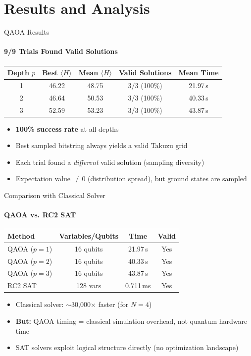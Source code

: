 \documentclass[aspectratio=169, t]{beamer}
\begin{document}
\section{Results and Analysis}

\begin{frame}{QAOA Results}
\framesubtitle{9/9 Trials Found Valid Solutions}

\begin{table}
\centering
\begin{tabular}{@{} ccccc @{}}
    \toprule
    Depth $p$ & Best $\langle H \rangle$ & Mean $\langle H \rangle$ & Valid Solutions & Mean Time \\
    \midrule
    1 & 46.22 & 48.75 & 3/3 (100\%) & 21.97\,s \\
    2 & 46.64 & 50.53 & 3/3 (100\%) & 40.33\,s \\
    3 & 52.59 & 53.23 & 3/3 (100\%) & 43.87\,s \\
    \bottomrule
\end{tabular}
\end{table}

\bigskip
\begin{itemize}
    \item \textbf{100\% success rate} at all depths
    \item Best sampled bitstring always yields a valid Takuzu grid
    \item Each trial found a \emph{different} valid solution (sampling diversity)
    \item Expectation value $\neq 0$ (distribution spread), but ground states are sampled
\end{itemize}
\end{frame}

\begin{frame}{Comparison with Classical Solver}
\framesubtitle{QAOA vs. RC2 SAT}

\begin{table}
\centering
\begin{tabular}{@{} lccc @{}}
    \toprule
    Method & Variables/Qubits & Time & Valid \\
    \midrule
    QAOA ($p=1$) & 16 qubits & 21.97\,s & Yes \\
    QAOA ($p=2$) & 16 qubits & 40.33\,s & Yes \\
    QAOA ($p=3$) & 16 qubits & 43.87\,s & Yes \\
    RC2 SAT & 128 vars & 0.711\,ms & Yes \\
    \bottomrule
\end{tabular}
\end{table}

\bigskip
\begin{itemize}
    \item Classical solver: $\sim$30,000$\times$ faster (for $N=4$)
    \item \textbf{But:} QAOA timing = classical simulation overhead, not quantum hardware time
    \item SAT solvers exploit logical structure directly (no optimization landscape)
\end{itemize}
\end{frame}
\end{document}
